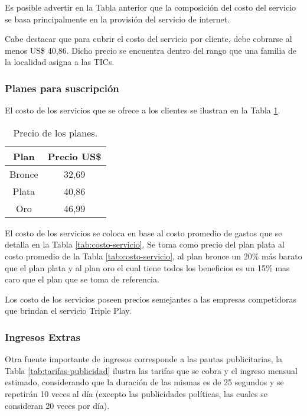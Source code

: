 \begin{itemize}
Es posible advertir en la Tabla anterior que la composición del costo del servicio
se basa principalmente en la provisión del servicio de internet.

Cabe destacar que para cubrir el costo del servicio por cliente, debe cobrarse al menos US\$ 40,86.
Dicho precio se encuentra dentro del rango que una familia de la localidad asigna a las TICs.

\subsubsection{Planes para suscripción}
El costo de los servicios que se ofrece a los clientes se ilustran en la Tabla \ref{tab:precio-planes}.


\begin{table}[H]
  \centering
    \begin{tabular}{|c|c|}
    \hline
    \rowcolor[rgb]{ .773,  .851,  .945} \textbf{Plan} & \textbf{Precio US\$} \bigstrut\\
    \hline
    Bronce & 32,69 \bigstrut\\
    \hline
    Plata & 40,86 \bigstrut\\
    \hline
    Oro   & 46,99 \bigstrut\\
    \hline
    \end{tabular}%
    \caption{Precio de los planes.}
  \label{tab:precio-planes}%
\end{table}%


El costo de los servicios se coloca en base al costo promedio de gastos que se detalla en la Tabla \ref{tab:costo-servicio}. Se toma como precio del plan plata al costo promedio de la Tabla \ref{tab:costo-servicio}, al plan bronce un 20\% más barato que el plan plata y al plan oro el cual tiene todos los beneficios es un 15\% mas caro que el plan que se toma de referencia. 

Los costo de los servicios poseen precios semejantes a las  empresas competidoras que brindan el servicio
Triple Play.


\subsubsection{Ingresos Extras}
Otra fuente importante de ingresos corresponde a las pautas publicitarias, la Tabla \ref{tab:tarifas-publicidad} ilustra las tarifas
que se cobra y el ingreso mensual estimado, considerando que la duración de las mismas es de 25 segundos
y se repetirán 10 veces al día (excepto las publicidades políticas, las cuales se consideran 20 veces por día).


\end{itemize}
